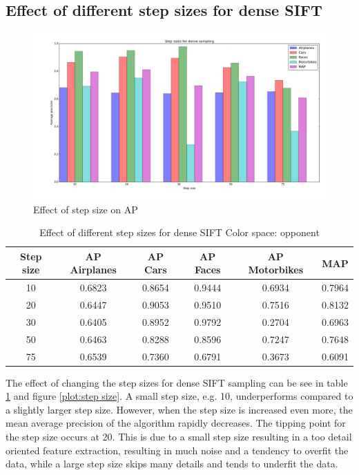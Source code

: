 
\subsection{Effect of different step sizes for dense SIFT}
\begin{figure}[H]
\includegraphics[width=\textwidth]{../plots/step_sizes_dense_sampling}
\caption{Effect of step size on AP}
\label{plot:stepsize}
\end{figure}
\begin{table}[H]
\begin{tabular}{|c|ccccc|}
\hline
\textbf{Step size} & \textbf{AP Airplanes} & \textbf{AP Cars} & \textbf{AP Faces} & \textbf{AP Motorbikes} & \textbf{MAP}\\
\hline
10 & 0.6823 & 0.8654 & 0.9444 & 0.6934 & 0.7964\\
20 & 0.6447 & 0.9053 & 0.9510 & 0.7516 & 0.8132\\
30 & 0.6405 &  0.8952& 0.9792& 0.2704 & 0.6963\\
50 & 0.6463 & 0.8288 & 0.8596 & 0.7247 & 0.7648\\
75 & 0.6539 & 0.7360 & 0.6791 & 0.3673 & 0.6091\\
\hline
\end{tabular}
\caption{Effect of different step sizes for dense SIFT Color space: opponent}
\label{tab:stepsize}
\end{table}

The effect of changing the step sizes for dense SIFT sampling can be see in table \ref{tab:stepsize} and figure \ref{plot:step size}. A small step size, e.g. 10, underperforms compared to a slightly larger step size. However, when the step size is increased even more, the mean average precision of the algorithm rapidly decreases. The tipping point for the step size occurs at 20. This is due to a small step size resulting in a too detail oriented feature extraction, resulting in much noise and a tendency to overfit the data, while a large step size skips many details and tends to underfit the data. 